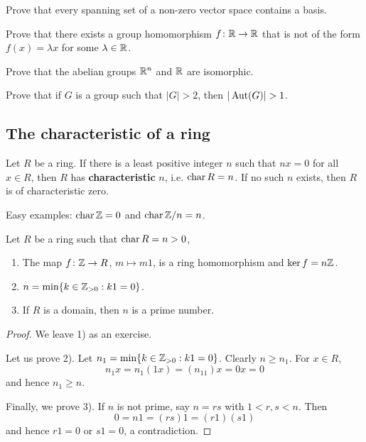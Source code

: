 \begin{exercise}
    Prove that every spanning set of a non-zero vector space
    contains a basis. 
\end{exercise}

\begin{exercise}
\label{xca:fx=cx}
    Prove that there exists a group homomorphism $f\colon\mathbb{R}\to\mathbb{R}$ that 
    is not of the form $f(x)=\lambda x$ for some $\lambda\in\mathbb{R}$. 
\end{exercise}


\begin{exercise}
\label{xca:Rn=R}
    Prove that the abelian groups $\mathbb{R}^n$ and $\mathbb{R}$ are isomorphic.
\end{exercise}

\begin{exercise}
\label{xca:aut}
    Prove that if $G$ is a group such that $|G|>2$, then $|\Aut(G)|>1$.
\end{exercise}

\subsection{The characteristic of a ring}

\begin{definition}
Let $R$ be a ring. If there is a least positive integer $n$ such that 
$nx=0$ for all $x\in R$, then $R$ has \textbf{characteristic} $n$, i.e. $\operatorname{char} R=n$. If no such $n$ exists, 
then $R$ is of characteristic zero. 
\end{definition}

Easy examples: $\operatorname{char}\mathbb{Z}=0$ and $\operatorname{char}\mathbb{Z}/n=n$.

\begin{proposition}
    Let $R$ be a ring such that $\operatorname{char} R=n>0$,
    \begin{enumerate}
        \item The map $f\colon \mathbb{Z}\to R$, $m\mapsto m1$, is a ring homomorphism and $\ker f=n\mathbb{Z}$.  
        \item $n=\min\{k\in\mathbb{Z}_{>0}:k1=0\}$.
        \item If $R$ is a domain, then $n$ is a prime number.
    \end{enumerate}
\end{proposition}

\begin{proof}
    We leave 1) as an exercise. 
    
    Let us prove 2). Let $n_1=\min\{k\in\mathbb{Z}_{>0}:k1=0\}$. Clearly 
    $n\geq n_1$. For $x\in R$,
    \[ 
    n_1x=n_1(1x)=(n_11)x=0x=0
    \]
    and hence $n_1\geq n$. 
    
    Finally, we prove 3). If $n$ is not prime, say
    $n=rs$ with $1<r,s<n$. Then 
    \[
    0=n1=(rs)1=(r1)(s1)
    \]
    and hence $r1=0$ or $s1=0$, a contradiction. 
\end{proof}


